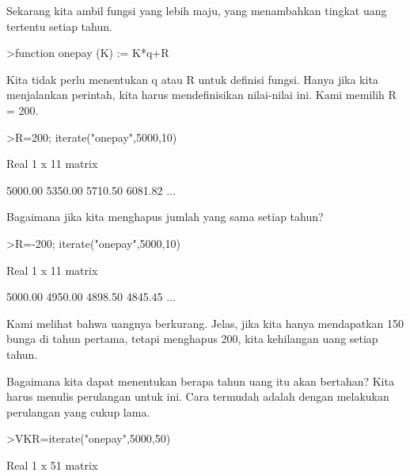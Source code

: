 \documentclass[a4paper,10pt]{article}
\begin{document}
\begin{eulernotebook}
\begin{eulercomment}
\begin{eulercomment}
\begin{eulercomment}
\begin{eulercomment}
\begin{eulercomment}
\begin{eulercomment}
\begin{eulercomment}
\begin{eulercomment}
\begin{eulercomment}
Sekarang kita ambil fungsi yang lebih maju, yang menambahkan tingkat
uang tertentu setiap tahun.
\end{eulercomment}
\begin{eulerprompt}
>function onepay (K) := K*q+R
\end{eulerprompt}
\begin{eulercomment}
Kita tidak perlu menentukan q atau R untuk definisi fungsi. Hanya jika
kita menjalankan perintah, kita harus mendefinisikan nilai-nilai ini.
Kami memilih R = 200.
\end{eulercomment}
\begin{eulerprompt}
>R=200; iterate("onepay",5000,10)
\end{eulerprompt}
\begin{euleroutput}
  Real 1 x 11 matrix
  
      5000.00     5350.00     5710.50     6081.82     ...
\end{euleroutput}
\begin{eulercomment}
Bagaimana jika kita menghapus jumlah yang sama setiap tahun?
\end{eulercomment}
\begin{eulerprompt}
>R=-200; iterate("onepay",5000,10)
\end{eulerprompt}
\begin{euleroutput}
  Real 1 x 11 matrix
  
      5000.00     4950.00     4898.50     4845.45     ...
\end{euleroutput}
\begin{eulercomment}
Kami melihat bahwa uangnya berkurang. Jelas, jika kita hanya
mendapatkan 150 bunga di tahun pertama, tetapi menghapus 200, kita
kehilangan uang setiap tahun.

Bagaimana kita dapat menentukan berapa tahun uang itu akan bertahan?
Kita harus menulis perulangan untuk ini. Cara termudah adalah dengan
melakukan perulangan yang cukup lama.
\end{eulercomment}
\begin{eulerprompt}
>VKR=iterate("onepay",5000,50)
\end{eulerprompt}
\begin{euleroutput}
  Real 1 x 51 matrix
  

\end{euleroutput}
\end{eulercomment}
\end{eulercomment}
\end{eulercomment}
\end{eulercomment}
\end{eulercomment}
\end{eulercomment}
\end{eulercomment}
\end{eulercomment}
\end{eulernotebook}
\end{document}
